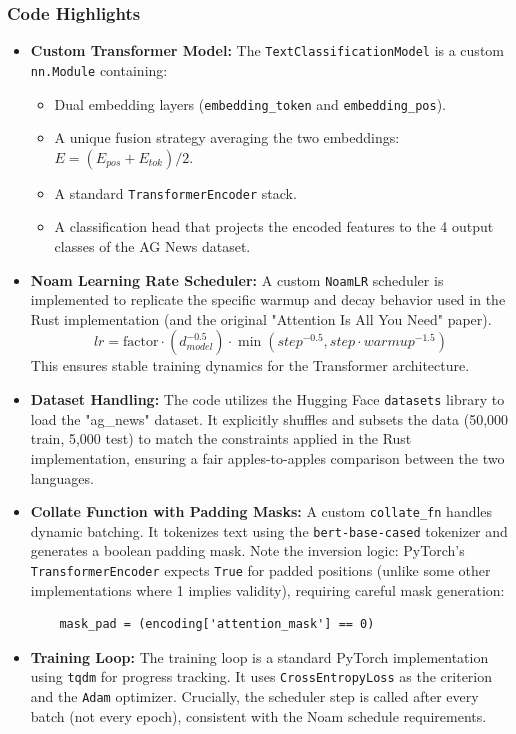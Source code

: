 \documentclass[10pt,a4paper,twocolumn]{article}
\begin{document}
\subsubsection{Code Highlights}
\begin{itemize}
    \item \textbf{Custom Transformer Model:}
    The \texttt{TextClassificationModel} is a custom \texttt{nn.Module} containing:
    \begin{itemize}
        \item Dual embedding layers (\texttt{embedding\_token} and \texttt{embedding\_pos}).
        \item A unique fusion strategy averaging the two embeddings: $E = (E_{pos} + E_{tok}) / 2$.
        \item A standard \texttt{TransformerEncoder} stack.
        \item A classification head that projects the encoded features to the 4 output classes of the AG News dataset.
    \end{itemize}
    \item \textbf{Noam Learning Rate Scheduler:}
    A custom \texttt{NoamLR} scheduler is implemented to replicate the specific warmup and decay behavior used in the Rust implementation (and the original "Attention Is All You Need" paper).
    \[
    lr = \text{factor} \cdot (d_{model}^{-0.5}) \cdot \min(step^{-0.5}, step \cdot warmup^{-1.5})
    \]
    This ensures stable training dynamics for the Transformer architecture.
    \item \textbf{Dataset Handling:}
    The code utilizes the Hugging Face \texttt{datasets} library to load the "ag\_news" dataset. It explicitly shuffles and subsets the data (50,000 train, 5,000 test) to match the constraints applied in the Rust implementation, ensuring a fair apples-to-apples comparison between the two languages.
    \item \textbf{Collate Function with Padding Masks:}
    A custom \texttt{collate\_fn} handles dynamic batching. It tokenizes text using the \texttt{bert-base-cased} tokenizer and generates a boolean padding mask. Note the inversion logic: PyTorch's \texttt{TransformerEncoder} expects \texttt{True} for padded positions (unlike some other implementations where 1 implies validity), requiring careful mask generation:
    \begin{verbatim}
    mask_pad = (encoding['attention_mask'] == 0)
    \end{verbatim}
    \item \textbf{Training Loop:}
    The training loop is a standard PyTorch implementation using \texttt{tqdm} for progress tracking. It uses \texttt{CrossEntropyLoss} as the criterion and the \texttt{Adam} optimizer. Crucially, the scheduler step is called after every batch (not every epoch), consistent with the Noam schedule requirements.
\end{itemize}
\end{document}
